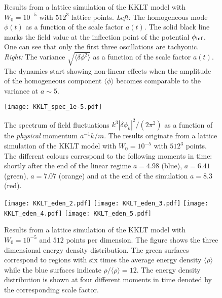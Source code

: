 \documentclass[12pt]{article}
\begin{document}
\begin{figure}
\centering
{}
\hfill
{}
\caption{Results from a lattice simulation of the KKLT model with $W_0=10^{-5}$ with $512^3$ lattice points. \textit{Left:} The homogeneous mode $\phi(t)$ as a function of the scale factor $a(t)$. The solid black line marks the field value at the inflection point of the potential $\phi_{\rm inf}$. One can see that only the first three oscillations are tachyonic. \textit{Right:} The variance $\sqrt{\langle\delta\phi^2\rangle}$ as a function of the scale factor $a(t)$. The dynamics start showing non-linear effects when the amplitude of the homogeneous component $\langle\phi\rangle$ becomes comparable to the variance at $a\sim5$.}
\label{fig:mean_variance_KKLT_1e-5}
\end{figure}

\begin{figure}
\begin{center}\texttt{[image: KKLT\_spec\_1e-5.pdf]}
\end{center}
\caption{The spectrum of field fluctuations $k^3|\delta\phi_k|^2/(2\pi^2)$ as a function of the \textit{physical} momentum $a^{-1}k/m$. The results originate from a lattice simulation of the KKLT model with $W_0=10^{-5}$ with $512^3$ points. The different colours correspond to the following moments in time: shortly after the end of the linear regime $a=4.98$ (blue), $a=6.41$  (green), $a=7.07$ (orange) and at the end of the simulation $a=8.3$ (red).}
\label{fig:KKLT_spec_1e-5}
\end{figure}


\begin{figure}
\begin{center}
\texttt{[image: KKLT\_eden\_2.pdf]}
\texttt{[image: KKLT\_eden\_3.pdf]}
\texttt{[image: KKLT\_eden\_4.pdf]}
\texttt{[image: KKLT\_eden\_5.pdf]}
\end{center}
\caption{Results from a lattice simulation of the KKLT model with $W_0=10^{-5}$ and $512$ points per dimension. The figure shows the three dimensional energy density distribution. The green surfaces correspond to regions with six times the average energy density $\langle\rho\rangle$ while the blue surfaces indicate $\rho/\langle\rho\rangle = 12$. The energy density distribution is shown at four different moments in time denoted by the corresponding scale factor.}
\label{fig:energydensity_KKLT}
\end{figure}
\end{document}
